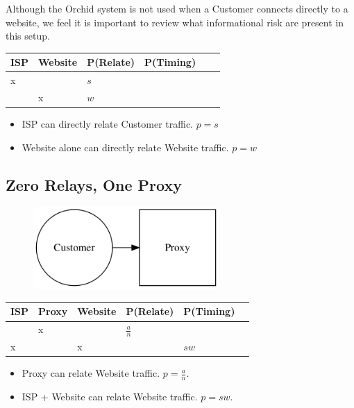 \documentclass{article}
\newcommand{\mesh}{Orchid}
\newcommand{\Mesh}{\mesh}
\begin{document}
Although the \Mesh{} system is not used when a Customer connects directly to a website, we feel it is important to review what informational risk are present in this setup.

\begin{center}
\begin{tabular}{l | l | l | l | l | l}
  ISP & Website & P(Relate)          & P(Timing) \\
  \hline
  x   &         & $s$                & \\
  \hline
      & x       & $w$                & \\
\end{tabular}
\end{center}

\begin{itemize}
\item ISP can directly relate Customer traffic. $p = s$
\item Website alone can directly relate Website traffic. $p = w$
\end{itemize}

\subsection{Zero Relays, One Proxy}

\begin{figure}[htbp]
  \centering
  \includegraphics[width = 200pt]{sc}
  \caption{}
\end{figure}

\begin{center}
\begin{tabular}{l | l | l | l | l | l}
  ISP & Proxy & Website & P(Relate)          & P(Timing) \\
  \hline
      & x     &         & $\frac{a}{n}$      & \\
  \hline
  x   &       & x       &                    & $sw$ \\
\end{tabular}
\end{center}

\begin{itemize}
\item Proxy can relate Website traffic. $p = \frac{a}{n}$.
\item ISP + Website can relate Website traffic. $p = sw$.
\end{itemize}
\end{document}
